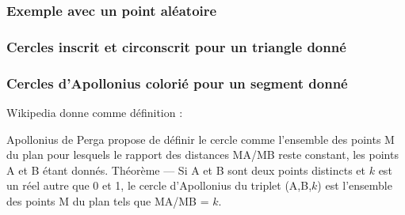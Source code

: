  \subsubsection{Exemple avec un point aléatoire} 
% 
\begin{tkzexample}[latex=7 cm]
 \end{tkzexample}      

\newpage
 \subsubsection{Cercles inscrit et circonscrit pour un triangle donné}
\begin{tkzexample}[vbox]  
\end{tkzexample}

   
\newpage
 \subsubsection{Cercles d'Apollonius colorié pour un segment donné} 
Wikipedia donne comme définition :
 
Apollonius de Perga propose de définir le cercle comme l'ensemble des points M du plan pour lesquels le rapport des distances MA/MB reste constant, les points A et B étant donnés. 
Théorème — Si A et B sont deux points distincts et $k$ est un réel autre que 0 et 1, le cercle d'Apollonius du triplet (A,B,$k$) est l'ensemble des points M du plan tels que MA/MB = $k$.
                                      

